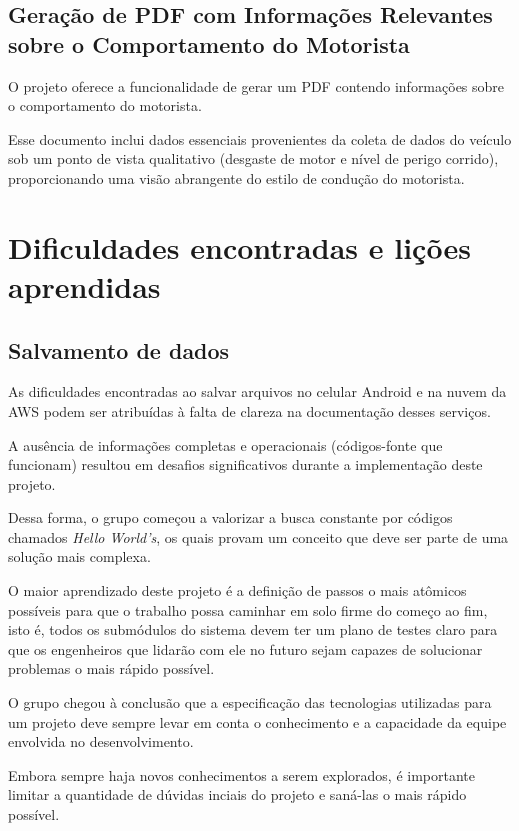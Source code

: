 \subsection{Geração de PDF com Informações Relevantes sobre o Comportamento do Motorista}

O projeto oferece a funcionalidade de gerar um PDF contendo informações sobre o comportamento do motorista. 

Esse documento inclui dados essenciais provenientes da coleta de dados do veículo sob um ponto de vista qualitativo (desgaste de motor e nível de perigo corrido), proporcionando uma visão abrangente do estilo de condução do motorista.

\section{Dificuldades encontradas e lições aprendidas}

\subsection{Salvamento de dados}
    
    As dificuldades encontradas ao salvar arquivos no celular Android e na nuvem da AWS podem ser atribuídas à falta de clareza na documentação desses serviços.
    
    A ausência de informações completas e operacionais (códigos-fonte que funcionam) resultou em desafios significativos durante a implementação deste projeto.
    
    Dessa forma, o grupo começou a valorizar a busca constante por códigos chamados \textit{Hello World's}, os quais provam um conceito que deve ser parte de uma solução mais complexa.
    
    O maior aprendizado deste projeto é a definição de passos o mais atômicos possíveis para que o trabalho possa caminhar em solo firme do começo ao fim, isto é, todos os submódulos do sistema devem ter um plano de testes claro para que os engenheiros que lidarão com ele no futuro sejam capazes de solucionar problemas o mais rápido possível.

    O grupo chegou à conclusão que a especificação das tecnologias utilizadas para um projeto deve sempre levar em conta o conhecimento e a capacidade da equipe envolvida no desenvolvimento.

    Embora sempre haja novos conhecimentos a serem explorados, é importante limitar a quantidade de dúvidas inciais do projeto e saná-las o mais rápido possível.

